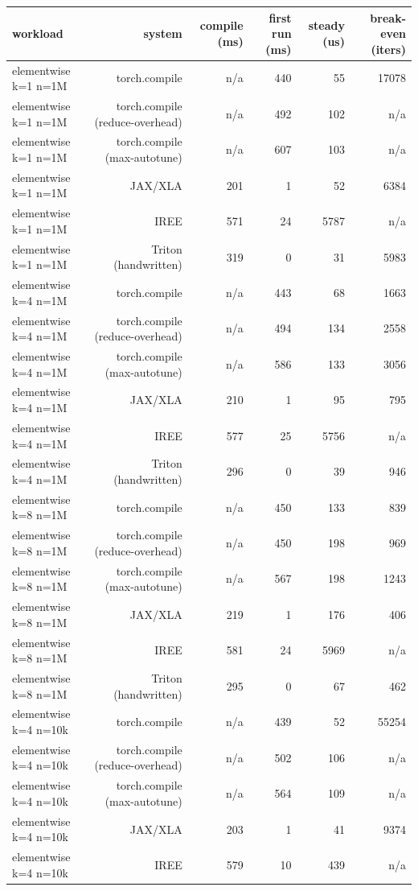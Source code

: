\begin{tabular}{lrrrrr}
\toprule
workload & system & compile (ms) & first run (ms) & steady (us) & break-even (iters) \\
\midrule
elementwise k=1 n=1M & torch.compile & n/a & 440 & 55 & 17078 \\
elementwise k=1 n=1M & torch.compile (reduce-overhead) & n/a & 492 & 102 & n/a \\
elementwise k=1 n=1M & torch.compile (max-autotune) & n/a & 607 & 103 & n/a \\
elementwise k=1 n=1M & JAX/XLA & 201 & 1 & 52 & 6384 \\
elementwise k=1 n=1M & IREE & 571 & 24 & 5787 & n/a \\
elementwise k=1 n=1M & Triton (handwritten) & 319 & 0 & 31 & 5983 \\
elementwise k=4 n=1M & torch.compile & n/a & 443 & 68 & 1663 \\
elementwise k=4 n=1M & torch.compile (reduce-overhead) & n/a & 494 & 134 & 2558 \\
elementwise k=4 n=1M & torch.compile (max-autotune) & n/a & 586 & 133 & 3056 \\
elementwise k=4 n=1M & JAX/XLA & 210 & 1 & 95 & 795 \\
elementwise k=4 n=1M & IREE & 577 & 25 & 5756 & n/a \\
elementwise k=4 n=1M & Triton (handwritten) & 296 & 0 & 39 & 946 \\
elementwise k=8 n=1M & torch.compile & n/a & 450 & 133 & 839 \\
elementwise k=8 n=1M & torch.compile (reduce-overhead) & n/a & 450 & 198 & 969 \\
elementwise k=8 n=1M & torch.compile (max-autotune) & n/a & 567 & 198 & 1243 \\
elementwise k=8 n=1M & JAX/XLA & 219 & 1 & 176 & 406 \\
elementwise k=8 n=1M & IREE & 581 & 24 & 5969 & n/a \\
elementwise k=8 n=1M & Triton (handwritten) & 295 & 0 & 67 & 462 \\
elementwise k=4 n=10k & torch.compile & n/a & 439 & 52 & 55254 \\
elementwise k=4 n=10k & torch.compile (reduce-overhead) & n/a & 502 & 106 & n/a \\
elementwise k=4 n=10k & torch.compile (max-autotune) & n/a & 564 & 109 & n/a \\
elementwise k=4 n=10k & JAX/XLA & 203 & 1 & 41 & 9374 \\
elementwise k=4 n=10k & IREE & 579 & 10 & 439 & n/a \\

\end{tabular}
